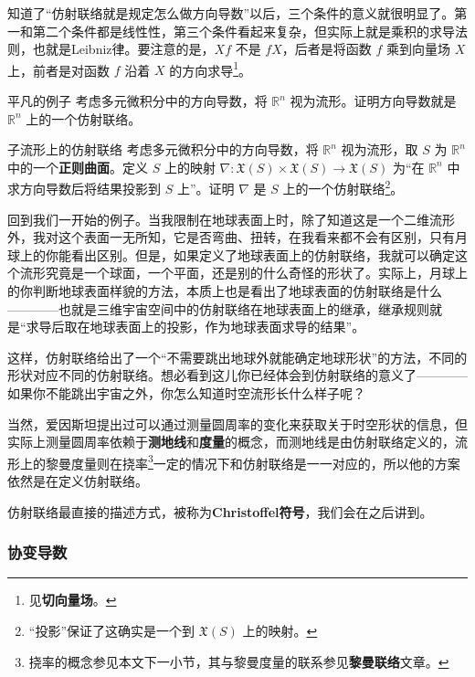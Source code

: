 知道了“仿射联络就是规定怎么做方向导数”以后，三个条件的意义就很明显了。第一和第二个条件都是线性性，第三个条件看起来复杂，但实际上就是乘积的求导法则，也就是Leibniz律。要注意的是，$Xf$ 不是 $fX$，后者是将函数 $f$ 乘到向量场 $X$ 上，前者是对函数 $f$ 沿着 $X$ 的方向求导\footnote{见\textbf{切向量场}。}。


\begin{exercise}{平凡的例子}
考虑多元微积分中的方向导数，将 $\mathbb{R}^n$ 视为流形。证明方向导数就是 $\mathbb{R}^n$ 上的一个仿射联络。
\end{exercise}

\begin{exercise}{子流形上的仿射联络}
考虑多元微积分中的方向导数，将 $\mathbb{R}^n$ 视为流形，取 $S$ 为 $\mathbb{R}^n$ 中的一个\textbf{正则曲面}。定义 $S$ 上的映射 $\nabla:\mathfrak{X}(S)\times\mathfrak{X}(S)\to\mathfrak{X}(S)$ 为“在 $\mathbb{R}^n$ 中求方向导数后将结果投影到 $S$ 上”。证明 $\nabla$ 是 $S$ 上的一个仿射联络\footnote{“投影”保证了这确实是一个到 $\mathfrak{X}(S)$ 上的映射。}。
\end{exercise}

回到我们一开始的例子。当我限制在地球表面上时，除了知道这是一个二维流形外，我对这个表面一无所知，它是否弯曲、扭转，在我看来都不会有区别，只有月球上的你能看出区别。但是，如果定义了地球表面上的仿射联络，我就可以确定这个流形究竟是一个球面，一个平面，还是别的什么奇怪的形状了。实际上，月球上的你判断地球表面样貌的方法，本质上也是看出了地球表面的仿射联络是什么————也就是三维宇宙空间中的仿射联络在地球表面上的继承，继承规则就是“求导后取在地球表面上的投影，作为地球表面求导的结果”。

这样，仿射联络给出了一个“不需要跳出地球外就能确定地球形状”的方法，不同的形状对应不同的仿射联络。想必看到这儿你已经体会到仿射联络的意义了————如果你不能跳出宇宙之外，你怎么知道时空流形长什么样子呢？

当然，爱因斯坦提出过可以通过测量圆周率的变化来获取关于时空形状的信息，但实际上测量圆周率依赖于\textbf{测地线}和\textbf{度量}的概念，而测地线是由仿射联络定义的，流形上的黎曼度量则在挠率\footnote{挠率的概念参见本文下一小节，其与黎曼度量的联系参见\textbf{黎曼联络}文章。}一定的情况下和仿射联络是一一对应的，所以他的方案依然是在定义仿射联络。

仿射联络最直接的描述方式，被称为\textbf{Christoffel符号}，我们会在之后讲到。

\subsubsection{协变导数}

